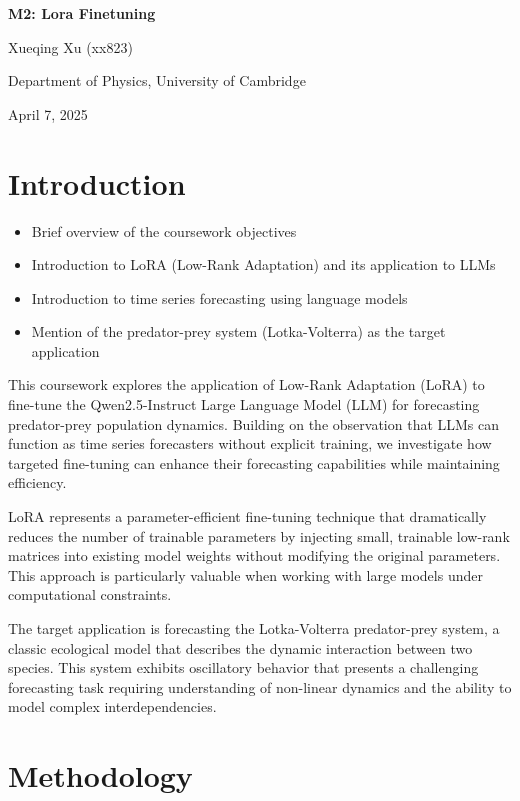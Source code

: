 \documentclass{article}
\begin{document}
\begin{center}
    \huge\textbf{M2: Lora Finetuning}
\end{center}



\begin{center}
    \Large Xueqing Xu (xx823)
    
    Department of Physics, University of Cambridge
    
    April 7, 2025
\end{center}

\section*{Introduction}
\begin{itemize}
    \item Brief overview of the coursework objectives
    \item Introduction to LoRA (Low-Rank Adaptation) and its application to LLMs
    \item Introduction to time series forecasting using language models
    \item Mention of the predator-prey system (Lotka-Volterra) as the target application
\end{itemize}
This coursework explores the application of Low-Rank Adaptation (LoRA) to fine-tune the Qwen2.5-Instruct Large Language Model (LLM) for forecasting predator-prey population dynamics. Building on the observation that LLMs can function as time series forecasters without explicit training\cite{gruver2023large}, we investigate how targeted fine-tuning can enhance their forecasting capabilities while maintaining efficiency.

LoRA represents a parameter-efficient fine-tuning technique that dramatically reduces the number of trainable parameters by injecting small, trainable low-rank matrices into existing model weights without modifying the original parameters. This approach is particularly valuable when working with large models under computational constraints.

The target application is forecasting the Lotka-Volterra predator-prey system, a classic ecological model that describes the dynamic interaction between two species. This system exhibits oscillatory behavior that presents a challenging forecasting task requiring understanding of non-linear dynamics and the ability to model complex interdependencies.
\section*{Methodology}
\end{document}
